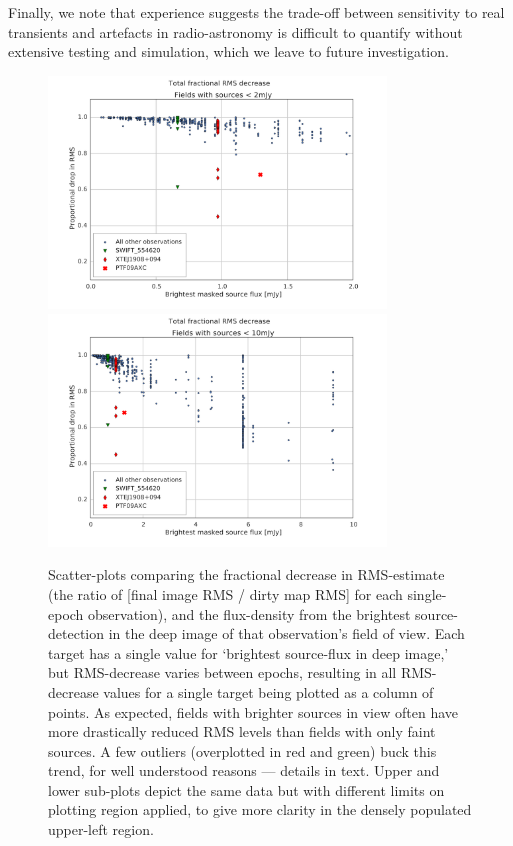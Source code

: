 \documentclass[5p,authoryear]{elsarticle}
\begin{document}
Finally, we note that experience suggests the trade-off between sensitivity to real transients and artefacts in radio-astronomy is difficult to quantify without extensive testing and simulation, which we leave to future investigation.

\begin{figure}[p]
\begin{center}  
  \includegraphics[width=0.8\textwidth]{../figures/rms_to_2mjy}
  \includegraphics[width=0.8\textwidth]{../figures/rms_to_10mjy}
  \caption[Fractional RMS decrease vs. brightest source flux]{%
  \label{fig:rms}
  Scatter-plots comparing the fractional decrease in RMS-estimate (the ratio of [final image RMS / dirty map RMS] for each single-epoch observation), and the flux-density from the brightest source-detection in the deep image of that observation's field of view. 
  Each target has a single value for `brightest source-flux in deep image,' but RMS-decrease varies between epochs, resulting in all RMS-decrease values for a single target being plotted as a column of points.
  As expected, fields with brighter sources in view often have more drastically reduced RMS levels than fields with only faint sources.
  A few outliers (overplotted in red and green) buck this trend, for well understood reasons --- details in text.
  Upper and lower sub-plots depict the same data but with different limits on plotting region applied, to give more clarity in the densely populated upper-left region.
} 
\end{center} 
\end{figure}
\end{document}
